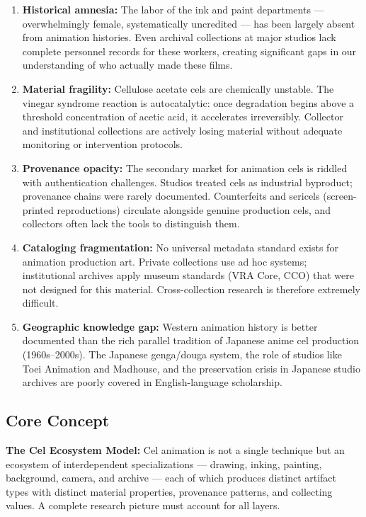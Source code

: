 \documentclass[11pt,letterpaper]{article}
\begin{document}
\begin{enumerate}
  \item \textbf{Historical amnesia:} The labor of the ink and paint departments --- overwhelmingly female, systematically uncredited --- has been largely absent from animation histories. Even archival collections at major studios lack complete personnel records for these workers, creating significant gaps in our understanding of who actually made these films.

  \item \textbf{Material fragility:} Cellulose acetate cels are chemically unstable. The vinegar syndrome reaction is autocatalytic: once degradation begins above a threshold concentration of acetic acid, it accelerates irreversibly. Collector and institutional collections are actively losing material without adequate monitoring or intervention protocols.

  \item \textbf{Provenance opacity:} The secondary market for animation cels is riddled with authentication challenges. Studios treated cels as industrial byproduct; provenance chains were rarely documented. Counterfeits and sericels (screen-printed reproductions) circulate alongside genuine production cels, and collectors often lack the tools to distinguish them.

  \item \textbf{Cataloging fragmentation:} No universal metadata standard exists for animation production art. Private collections use ad hoc systems; institutional archives apply museum standards (VRA Core, CCO) that were not designed for this material. Cross-collection research is therefore extremely difficult.

  \item \textbf{Geographic knowledge gap:} Western animation history is better documented than the rich parallel tradition of Japanese anime cel production (1960s--2000s). The Japanese genga/douga system, the role of studios like Toei Animation and Madhouse, and the preservation crisis in Japanese studio archives are poorly covered in English-language scholarship.
\end{enumerate}

\subsection{Core Concept}

\textbf{The Cel Ecosystem Model:} Cel animation is not a single technique but an ecosystem of interdependent specializations --- drawing, inking, painting, background, camera, and archive --- each of which produces distinct artifact types with distinct material properties, provenance patterns, and collecting values. A complete research picture must account for all layers.
\end{document}

